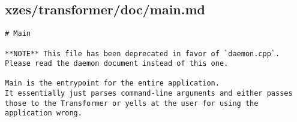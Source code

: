 \subsection{xzes/transformer/doc/main.md}
\begin{lstlisting}[caption={Documentation about the `main.cpp' file.}]
# Main

**NOTE** This file has been deprecated in favor of `daemon.cpp`.
Please read the daemon document instead of this one.

Main is the entrypoint for the entire application.
It essentially just parses command-line arguments and either passes those to the Transformer or yells at the user for using the application wrong.
\end{lstlisting}
